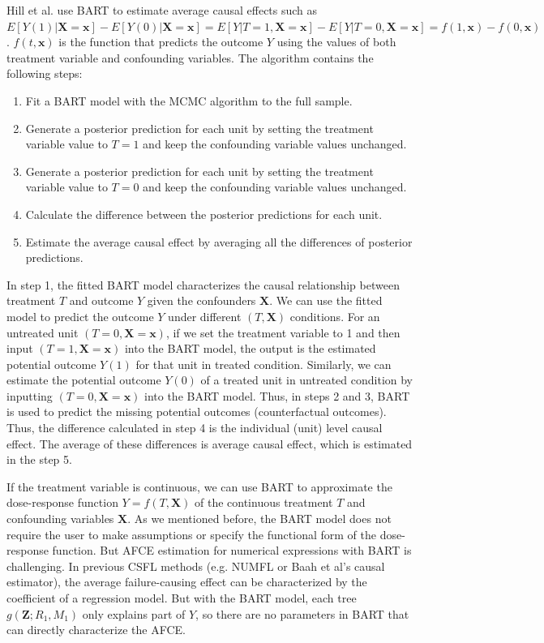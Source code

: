 Hill et al. use BART to estimate average causal effects such as $E[Y(1)|\pmb{X}=\pmb{x}] - E[Y(0)|\pmb{X}=\pmb{x}]=E[Y|T=1, \pmb{X}=\pmb{x}]-E[Y|T=0, \pmb{X}=\pmb{x}]=f(1,\pmb{x})-f(0,\pmb{x})$ . $f(t,\pmb{x})$ is the function that predicts the outcome $Y$ using the values of both treatment variable and confounding variables.  The algorithm contains the following steps:
\begin{enumerate}
\item Fit a BART model with the MCMC algorithm to the full sample.
\item Generate a posterior prediction for each unit by setting the treatment variable value to $T=1$ and keep the confounding variable values unchanged.
\item Generate a posterior prediction for each unit by setting the treatment variable value to $T=0$ and keep the confounding variable values unchanged.
\item Calculate the difference between the posterior predictions for each unit.
\item Estimate the average causal effect by averaging all the differences of posterior predictions.
\end{enumerate}

In step 1, the fitted BART model characterizes the causal relationship between treatment $T$ and outcome $Y$ given the confounders $\pmb{X}$. We can use the fitted model to predict the outcome $Y$ under different $(T, \pmb{X})$ conditions. For an untreated unit $(T=0, \pmb{X}=\pmb{x})$,  if we set the treatment variable to 1 and then input $(T=1, \pmb{X}=\pmb{x})$ into the BART model, the output is the estimated potential outcome $Y(1)$ for that unit in treated condition. Similarly, we can estimate the potential outcome $Y(0)$ of a treated unit in untreated condition by inputting $(T=0, \pmb{X}=\pmb{x})$ into the BART model. Thus, in steps 2 and 3, BART is used to predict the missing potential outcomes (counterfactual outcomes). Thus, the difference calculated in step 4 is the individual (unit) level causal effect. The average of these differences is average causal effect, which is estimated in the step 5.

If the treatment variable is continuous,  we can use BART to approximate the dose-response function $Y=f(T,\pmb{X})$ of the continuous treatment $T$ and confounding variables $\pmb{X}$.  As we mentioned before, the BART model does not require the user to make assumptions or specify the functional form of the dose-response function.  But AFCE estimation for numerical expressions with BART is challenging. In previous CSFL methods (e.g. NUMFL or Baah et al’s causal estimator), the average failure-causing effect can be characterized by the coefficient of a regression model.  But with the BART model, each tree $g(\pmb{Z};{R_1},{M_1})$ only explains part of $Y$, so there are no parameters in BART that can directly characterize the AFCE. 

